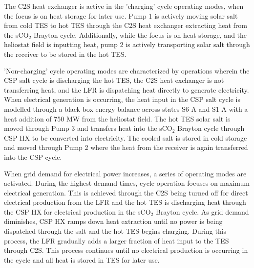 \begin{paracol}{2}
The C2S heat exchanger is active in the 'charging' cycle operating modes, when the focus is on heat storage for later use. Pump 1 is actively moving solar salt from cold TES to hot TES through the C2S heat exchanger extracting heat from the sCO$_2$ Brayton cycle. Additionally, while the focus is on heat storage, and the heliostat field is inputting heat, pump 2 is actively transporting solar salt through the receiver to be stored in the hot TES.

'Non-charging' cycle operating modes are characterized by operations wherein the CSP salt cycle is discharging the hot TES, the C2S heat exchanger is not transferring heat, and the LFR is dispatching heat directly to generate electricity. When electrical generation is occurring, the heat input in the CSP salt cycle is modelled through a black box energy balance across states S6-A and S1-A with a heat addition of 750 MW from the heliostat field. The hot TES solar salt is moved through Pump 3 and transfers heat into the sCO$_{2}$ Brayton cycle through CSP HX to be converted into electricity. The cooled salt is stored in cold storage and moved through Pump 2 where the heat from the receiver is again transferred into the CSP cycle. 

When grid demand for electrical power increases, a series of operating modes are activated. During the highest demand times, cycle operation focuses on maximum electrical generation. This is achieved through the C2S being turned off for direct electrical production from the LFR and the hot TES is discharging heat through the CSP HX for electrical production in the sCO$_2$ Brayton cycle. As grid demand diminishes, CSP HX ramps down heat extraction until no power is being dispatched through the salt and the hot TES begins charging. During this process, the LFR gradually adds a larger fraction of heat input to the TES through C2S. This process continues until no electrical production is occurring in the cycle and all heat is stored in TES for later use.





\end{paracol}
